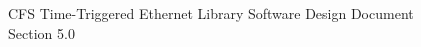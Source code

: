 \documentclass[twoside]{article}
\begin{document}
\hypersetup{pageanchor=false}
\begin{titlepage}
\begin{center}%
\vspace*{7.5cm}
{\Huge CFS Time-Triggered Ethernet Library Software Design Document}\\
\vspace*{0.5cm}
{\Huge Section 5.0}\\
\end{center}
\end{titlepage}
\tableofcontents
{}
\hypersetup{pageanchor=true}

\end{document}
